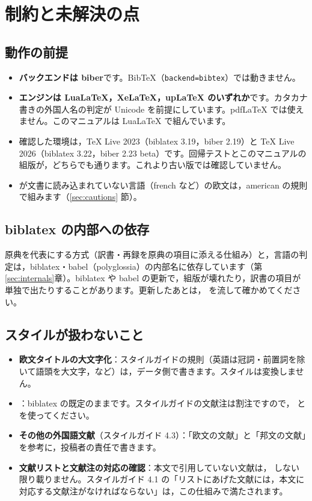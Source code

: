 \section{制約と未解決の点}\label{sec:limits}
\subsection{動作の前提}
\begin{itemize}
\item \textbf{バックエンドは biber}です。BibTeX（\texttt{backend=bibtex}）では動きません。
\item \textbf{エンジンは LuaLaTeX，XeLaTeX，upLaTeX のいずれか}です。カタカナ書きの外国人名の判定が Unicode を前提にしています。pdfLaTeX では使えません。このマニュアルは LuaLaTeX で組んでいます。
\item 確認した環境は，TeX Live 2023（biblatex 3.19，biber 2.19）と TeX Live 2026（biblatex 3.22，biber 2.23 beta）です。回帰テストとこのマニュアルの組版が，どちらでも通ります。これより古い版では確認していません。
\item {} が文書に読み込まれていない言語（french など）の欧文は，american の規則で組みます（\ref{sec:cautions} 節）。
\end{itemize}

\subsection{biblatex の内部への依存}
原典を代表にする方式（訳書・再録を原典の項目に添える仕組み）と，言語の判定は，biblatex・babel（polyglossia）の内部名に依存しています（第\ref{sec:internals}章）。biblatex や babel の更新で，組版が壊れたり，訳書の項目が単独で出たりすることがあります。更新したあとは， を流して確かめてください。

\subsection{スタイルが扱わないこと}
\begin{itemize}
\item \textbf{欧文タイトルの大文字化}：スタイルガイドの規則（英語は冠詞・前置詞を除いて語頭を大文字，など）は，データ側で書きます。スタイルは変換しません。
\item \textbf{}：biblatex の既定のままです。スタイルガイドの文献注は割注ですので， と  を使ってください。
\item \textbf{その他の外国語文献}（スタイルガイド 4.3）：「欧文の文献」と「邦文の文献」を参考に，投稿者の責任で書きます。
\item \textbf{文献リストと文献注の対応の確認}：本文で引用していない文献は， しない限り載りません。スタイルガイド 4.1 の「リストにあげた文献には，本文に対応する文献注がなければならない」は，この仕組みで満たされます。
\end{itemize}

